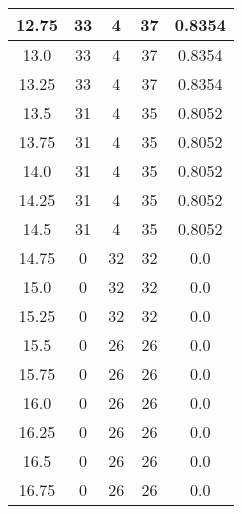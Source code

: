 \documentclass[letterpaper, 12pt]{article}
\begin{document}
\begin{longtable}{|c|c|c|c|c|}
\hline
12.75 & 33 & 4 & 37 & 0.8354 \\
\hline
13.0 & 33 & 4 & 37 & 0.8354 \\
\hline
13.25 & 33 & 4 & 37 & 0.8354 \\
\hline
13.5 & 31 & 4 & 35 & 0.8052 \\
\hline
13.75 & 31 & 4 & 35 & 0.8052 \\
\hline
14.0 & 31 & 4 & 35 & 0.8052 \\
\hline
14.25 & 31 & 4 & 35 & 0.8052 \\
\hline
14.5 & 31 & 4 & 35 & 0.8052 \\
\hline
14.75 & 0 & 32 & 32 & 0.0 \\
\hline
15.0 & 0 & 32 & 32 & 0.0 \\
\hline
15.25 & 0 & 32 & 32 & 0.0 \\
\hline
15.5 & 0 & 26 & 26 & 0.0 \\
\hline
15.75 & 0 & 26 & 26 & 0.0 \\
\hline
16.0 & 0 & 26 & 26 & 0.0 \\
\hline
16.25 & 0 & 26 & 26 & 0.0 \\
\hline
16.5 & 0 & 26 & 26 & 0.0 \\
\hline
16.75 & 0 & 26 & 26 & 0.0 \\
\hline
\end{longtable}
\end{document}
